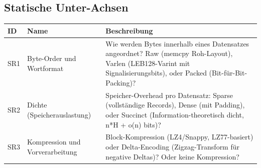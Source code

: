 \subsection*{Statische Unter-Achsen}
\begin{scriptsize}
\begin{longtable}{@{}>{\raggedright\arraybackslash}p{1.8cm} >{\raggedright\arraybackslash}p{3.2cm} >{\raggedright\arraybackslash}p{8.5cm}@{}}
\toprule
ID & Name & Beschreibung \\
\midrule
\endhead%
SR1 & Byte-Order und Wortformat & Wie werden Bytes innerhalb eines Datensatzes angeordnet? Raw (memcpy Roh-Layout), Varlen (LEB128-Varint mit Signalisierungsbits), oder Packed (Bit-für-Bit-Packing)? \\
SR2 & Dichte (Speicherauslastung) & Speicher-Overhead pro Datensatz: Sparse (vollständige Records), Dense (mit Padding), oder Succinct (Information-theoretisch dicht, n*H + o(n) bits)? \\
SR3 & Kompression und Vorverarbeitung & Block-Kompression (LZ4/\allowbreak{}Snappy, LZ77-basiert) oder Delta-Encoding (Zigzag-Transform für negative Deltas)? Oder keine Kompression? \\
\bottomrule
\end{longtable}
\end{scriptsize}

